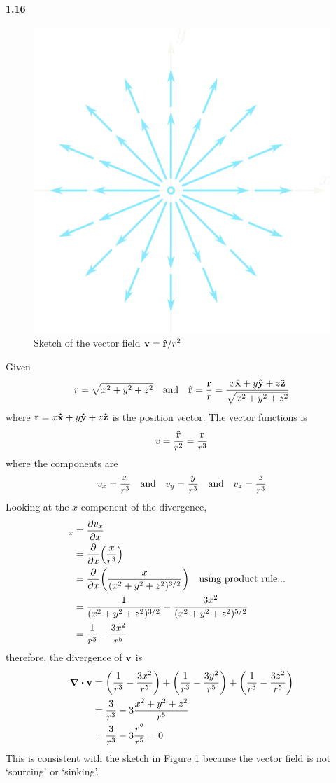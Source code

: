 \documentclass[../main.tex]{subfiles}
\begin{document}
\paragraph{1.16}
\begin{figure}[ht]
    \centering
    \includegraphics[width=0.4\linewidth]{images/fig1_16.png}
    \caption{Sketch of the vector field $\vb{v} = \vu{r} / r^2$}
    \label{fig:1.16}
\end{figure}
Given
\begin{align*}
    r = \sqrt{x^2 + y^2 + z^2} \qand
    \vu{r} = \frac{\vb{r}}{r} = \frac{x\vu{x} + y\vu{y} + z\vu{z}}{\sqrt{x^2 + y^2 + z^2}}
\end{align*}
where $\vb{r} = x\vu{x} + y\vu{y} + z\vu{z}$ is the position vector. The vector functions is
\begin{align*}
    v = \frac{\vu{r}}{r^2} = \frac{\vb{r}}{r^3}
\end{align*}
where the components are
\begin{align*}
    v_x = \frac{x}{r^3} \qand v_y = \frac{y}{r^3} \qand v_z = \frac{z}{r^3}
\end{align*}
Looking at the $x$ component of the divergence,
\begin{align*}
    [\div{\vb{v}}]_x &= \pdv{v_x}{x} \\
    &= \pdv{x}(\frac{x}{r^3}) \\
    &= \pdv{x}(\frac{x}{(x^2 + y^2 + z^2)^{3/2}}) \qq{using product rule...}\\
    &= \frac{1}{(x^2 + y^2 + z^2)^{3/2}} - \frac{3x^2}{(x^2 + y^2 + z^2)^{5/2}} \\
    &= \frac{1}{r^3} - \frac{3x^2}{r^5}
\end{align*}
therefore, the divergence of $\vb{v}$ is
\begin{align*}
    \div{\vb{v}} &= \quantity(\frac{1}{r^3} - \frac{3x^2}{r^5})
        + \quantity(\frac{1}{r^3} - \frac{3y^2}{r^5})
        + \quantity(\frac{1}{r^3} - \frac{3z^2}{r^5}) \\
    &= \frac{3}{r^3} - 3\frac{x^2 + y^2 + z^2}{r^5} \\
    &= \frac{3}{r^3} - 3\frac{r^2}{r^5} = 0
\end{align*}
This is consistent with the sketch in Figure \ref{fig:1.16} because the vector field is not 
`sourcing' or `sinking'.
\end{document}
